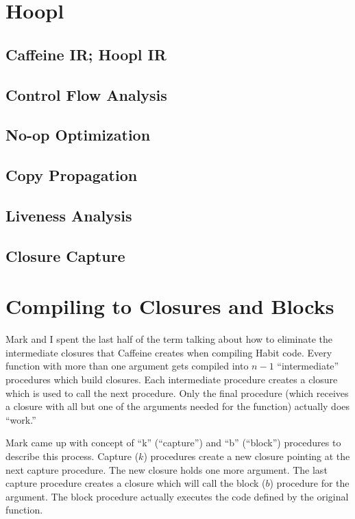 \documentclass[11pt]{article}
\begin{document}
\section*{Hoopl}

\subsection*{Caffeine IR; Hoopl IR}

\subsection*{Control Flow Analysis}
\subsection*{No-op Optimization}
\subsection*{Copy Propagation}
\subsection*{Liveness Analysis}
\subsection*{Closure Capture}

\section*{Compiling to Closures and Blocks}

Mark and I spent the last half of the term talking about how to eliminate
the intermediate closures that Caffeine creates when compiling Habit code. Every function
with more than one argument gets compiled into $n - 1$ ``intermediate'' procedures which
build closures. Each intermediate procedure creates a closure which is used to call
the next procedure. Only the final procedure (which receives a closure with all but one of
the arguments needed for the function) actually does ``work.'' 

Mark came up with concept of ``k'' (``capture'') and ``b'' (``block'')
procedures to describe this process. Capture ($k$) procedures create a
new closure pointing at the next capture procedure. The new closure
holds one more argument. The last capture procedure creates a closure
which will call the block ($b$) procedure for the argument. The block
procedure actually executes the code defined by the original function.
\end{document}
